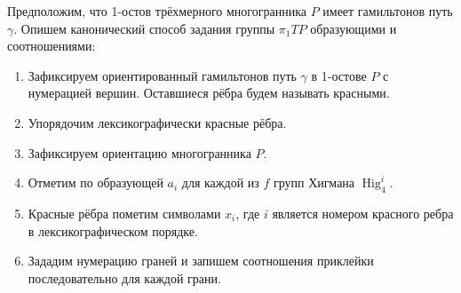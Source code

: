 \documentclass[14pt, dvipsnames, twoside]{extarticle}
\theoremstyle{definition}
\theoremstyle{remark}
\DeclareMathOperator{\Hig}{\mathrm{Hig}}
\begin{document}
Предположим, что 1-остов трёхмерного многогранника $P$ имеет гамильтонов путь $\gamma$. Опишем канонический способ задания группы $\pi_1TP$ образующими и соотношениями:

\begin{enumerate}[\bf 1.]

\item Зафиксируем ориентированный гамильтонов путь $\gamma$ в 1-остове $P$ с нумерацией вершин. Оставшиеся рёбра будем называть красными.

\item Упорядочим лексикографически красные рёбра.

\item Зафиксируем ориентацию многогранника $P$.

\item Отметим по образующей $a_i$ для каждой из $f$ групп Хигмана $\Hig^i_4$.

\item Красные рёбра пометим символами $x_i$, где $i$ является номером красного ребра в лексикографическом порядке.

\item Зададим нумерацию граней и запишем соотношения приклейки последовательно для каждой грани.      

\end{enumerate} 
\end{document}
